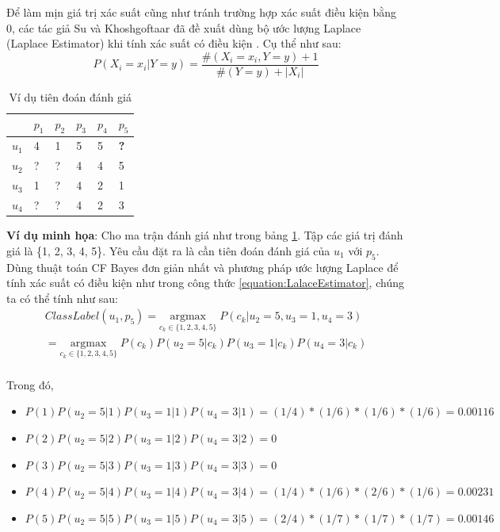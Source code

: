 Để làm mịn giá trị xác suất cũng như tránh trường hợp xác suất điều kiện bằng 0, các tác giả Su và Khoshgoftaar đã đề xuất dùng bộ ước lượng Laplace (Laplace Estimator) khi tính xác suất có điều kiện \cite{Su:2009:SCF}. Cụ thể như sau:
\begin{equation} \label{equation:LalaceEstimator}
P(X_{i} = x_{i} | Y = y) = \frac{\#(X_{i}=x_{i},Y=y) + 1}{\#(Y=y) + |X_{i}|}
\end{equation}
\begin{table}[ht]
\centering
    \caption{Ví dụ tiên đoán đánh giá} \label{tab:table_1_1}
    \begin{tabular}{p{1.5cm}|p{1.5cm}|p{1.5cm}|p{1.5cm}|p{1.5cm}|p{1.5cm}}
    \hline
    & $p_{1}$ & $p_{2}$ & $p_{3}$ & $p_{4}$ & $p_{5}$ \\
    \hline 
	$u_{1}$ & 4 & 1 & 5 & 5 & \textbf{?} \\
    $u_{2}$ & ? & ? & 4 & 4 & 5 \\
    $u_{3}$ & 1 & ? & 4 & 2 & 1 \\
    $u_{4}$ & ? & ? & 4 & 2 & 3 \\
    \hline
    \end{tabular}
\end{table}
\textbf{Ví dụ minh họa}: Cho ma trận đánh giá như trong bảng \ref{tab:table_1_1}. Tập các giá trị đánh giá là \{1, 2, 3, 4, 5\}. Yêu cầu đặt ra là cần tiên đoán đánh giá của $u_{1}$ với $p_{5}$. Dùng thuật toán CF Bayes đơn giản nhất và phương pháp ước lượng Laplace để tính xác suất có điều kiện như trong công thức \ref{equation:LalaceEstimator}, chúng ta có thể tính như sau:
\begin{equation} 
\begin{split}
\displaystyle ClassLabel(u_{1},p_{5}) = 
\underset{c_{k} \in \{1,2,3,4,5\}} {\mathrm{argmax}} \; P(c_{k} | u_{2}=5, u_{3}=1, u_{4}=3) \\
= \underset{c_{k} \in \{1,2,3,4,5\}} {\mathrm{argmax}} \; P(c_{k})P(u_{2} = 5 | c_{k})P(u_{3} = 1 | c_{k})P(u_{4}=3|c_{k}) \\
\end{split}
\end{equation}

Trong đó,
\begin{itemize}
\item $P(1)P(u_{2} = 5 | 1)P(u_{3} = 1 | 1)P(u_{4}=3|1) = (1/4)*(1/6)*(1/6)*(1/6) =  0.00116$
\item $P(2)P(u_{2} = 5 | 2)P(u_{3} = 1 | 2)P(u_{4}=3|2) = 0$
\item $P(3)P(u_{2} = 5 | 3)P(u_{3} = 1 | 3)P(u_{4}=3|3) = 0$
\item $P(4)P(u_{2} = 5 | 4)P(u_{3} = 1 | 4)P(u_{4}=3|4) = (1/4)*(1/6)*(2/6)*(1/6) = 0.00231$
\item $P(5)P(u_{2} = 5 | 5)P(u_{3} = 1 | 5)P(u_{4}=3|5) = (2/4)*(1/7)*(1/7)*(1/7) = 0.00146$
\end{itemize}

